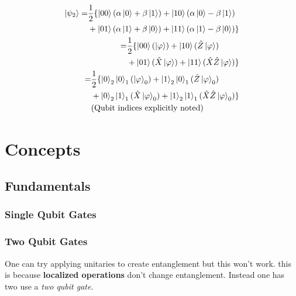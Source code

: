 \documentclass[reprint, amsmath,amssymb, aps]{revtex4-2}
\begin{document}
            \begin{align}
                \begin{split}
                \ket{\psi_2} =& \frac{1}{2} \{\ket{00}(\alpha\ket{0} + \beta\ket{1}) + \ket{10}(\alpha\ket{0} - \beta\ket{1}) \\
                &+ \ket{01}(\alpha\ket{1}+\beta\ket{0})+\ket{11}(\alpha\ket{1}-\beta\ket{0})\} \\
                \end{split}\\
                \begin{split}
                =& \frac{1}{2}\{\ket{00}(\ket{\varphi}) + \ket{10}(\hat{Z}\ket{\varphi}) \\
                &+ \ket{01}(\hat{X}\ket{\varphi})+\ket{11}(\hat{X}\hat{Z}\ket{\varphi})\} \label{eqn:global-state-2-re} \\
                \end{split}\\
                \begin{split}
                =& \frac{1}{2}\{\ket{0}_2\ket{0}_1(\ket{\varphi}_0) + \ket{1}_2\ket{0}_1(\hat{Z}\ket{\varphi}_0) \\
                &+ \ket{0}_2\ket{1}_1(\hat{X}\ket{\varphi}_0)+\ket{1}_2\ket{1}_1(\hat{X}\hat{Z}\ket{\varphi}_0)\}  \\
                &\text{(Qubit indices explicitly noted)} \\
                \end{split}
            \end{align}
        
    \section{Concepts}
        \subsection{Fundamentals}
            \subsubsection{Single Qubit Gates}

            \subsubsection{Two Qubit Gates}
                One can try applying unitaries to create entanglement but this won't work. this is because \textbf{localized operations} don't change entanglement. Instead one has two use a \textit{two qubit gate}. 
                
\end{document}
